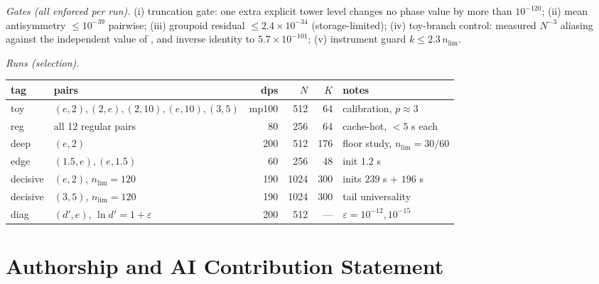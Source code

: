 \documentclass[11pt,a4paper]{article}
\theoremstyle{definition}
\theoremstyle{remark}
\begin{document}
\emph{Gates (all enforced per run).} (i) truncation gate: one extra explicit tower level
changes no phase value by more than $10^{-120}$; (ii) mean antisymmetry
$\le10^{-39}$ pairwise; (iii) groupoid residual $\le2.4\times10^{-34}$ (storage-limited);
(iv) toy-branch control: measured $N^{-3}$ aliasing against the independent value of
\cite[Rem.~7.5]{unified}, and inverse identity to $5.7\times10^{-101}$; (v) instrument
guard $k\le2.3\,n_{\mathrm{lim}}$.

\emph{Runs (selection).}

\begin{center}
\begin{tabular}{llrrrl}
\toprule
tag & pairs & dps & $N$ & $K$ & notes\\
\midrule
toy & $(e,2),(2,e),(2,10),(e,10),(3,5)$ & mp100 & 512 & 64 & calibration, $p\approx3$\\
reg & all 12 regular pairs & 80 & 256 & 64 & cache-hot, $<5$ s each\\
deep & $(e,2)$ & 200 & 512 & 176 & floor study, $n_{\mathrm{lim}}=30/60$\\
edge & $(1.5,e),(e,1.5)$ & 60 & 256 & 48 & init $1.2$ s\\
decisive & $(e,2)$, $n_{\mathrm{lim}}=120$ & 190 & 1024 & 300 & inits $239$ s $+$ $196$ s\\
decisive & $(3,5)$, $n_{\mathrm{lim}}=120$ & 190 & 1024 & 300 & tail universality\\
diag & $(d',e)$, $\ln d'=1+\varepsilon$ & 200 & 512 & --- & $\varepsilon=10^{-12},10^{-15}$\\
\bottomrule
\end{tabular}
\end{center}

\section*{Authorship and AI Contribution Statement}
\end{document}
